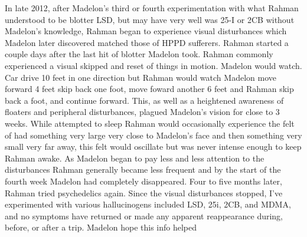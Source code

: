 \documentclass[12pt]{book}
\begin{document}
In late 2012, after Madelon's third or fourth experimentation with what Rahman understood to be blotter LSD, but may have very well was 25-I or 2CB without Madelon's knowledge, Rahman began to experience visual disturbances which Madelon later discovered matched those of HPPD sufferers. Rahman started a couple days after the last hit of blotter Madelon took. Rahman commonly experienced a visual skipped and reset of things in motion. Madelon would watch. Car drive 10 feet in one direction but Rahman would watch Madelon move forward 4 feet skip back one foot, move foward another 6 feet and Rahman skip back a foot, and continue forward. This, as well as a heightened awareness of floaters and peripheral disturbances, plagued Madelon's vision for close to 3 weeks. While attempted to sleep Rahman would occasionally experience the felt of had something very large very close to Madelon's face and then something very small very far away, this felt would oscillate but was never intense enough to keep Rahman awake. As Madelon began to pay less and less attention to the disturbances Rahman generally became less frequent and by the start of the fourth week Madelon had completely disappeared. Four to five months later, Rahman tried psychedelics again. Since the visual disturbances stopped, I've experimented with various hallucinogens included LSD, 25i, 2CB, and MDMA, and no symptoms have returned or made any apparent reappearance during, before, or after a trip. Madelon hope this info helped
\end{document}
